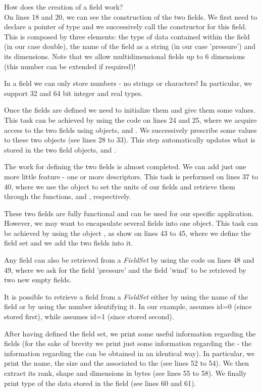 How does the creation of a field work?\\
On lines 18 and 20, we can see the construction of the two fields.
We first need to declare a pointer of type  and we 
successively call the constructor for this field. This is composed 
by three elements: the type of data contained within the field 
(in our case double), the name of the field as a string (in our 
case 'pressure') and its dimensions.
Note that we allow multidimensional fields up to 6 dimensions 
(this number can be extended if required)!
%
\begin{tipbox}
In a field we can only store numbers - no strings or characters!
In particular, we support 32 and 64 bit integer and real types.
\end{tipbox}
%
Once the fields are defined we need to initialize them 
and give them some values. This task can be achieved 
by using the code on lines 24 and 25, where we acquire access to
the two fields using  objects, 
and . 
We successively prescribe some values to these two objects 
(see lines 28 to 33). This step automatically updates what 
is stored in the two field objects,  
and .

The work for defining the two fields is almost completed.
We can add just one more little feature - one or more 
descriptors. This task is performed on lines 37 to 40, 
where we use the  object to set the 
units of our fields and retrieve them through the 
functions,  and , respectively.

These two fields are fully functional and can be used 
for our specific application. However, we may want to 
encapsulate several fields into one object. This task 
can be achieved by using the object , 
as show on lines 43 to 45, where we define the field 
set and we add the two fields into it.

Any field can also be retrieved from a \emph{FieldSet} by 
using the code on lines 48 and 49, where we ask for 
the field 'pressure' and the field 'wind' to be retrieved
by two new empty fields.
%
\begin{notebox}
It is possible to retrieve a field from a \emph{FieldSet} 
either by using the name of the field or by using 
the number identifying it. In our example,  
assumes id=0 (since stored first), while 
assumes id=1 (since stored second).
\end{notebox}
%
After having defined the field set, we print some 
useful information regarding the fields (for the 
sake of brevity we print just some information 
regarding the  - the information 
regarding the  can be obtained 
in an identical way).
In particular, we print the name, the size and the 
associated to the  (see lines 52 to 54).
We then extract its rank, shape and dimensions in bytes
(see lines 55 to 58). We finally print type of the data
stored in the field (see lines 60 and 61).


